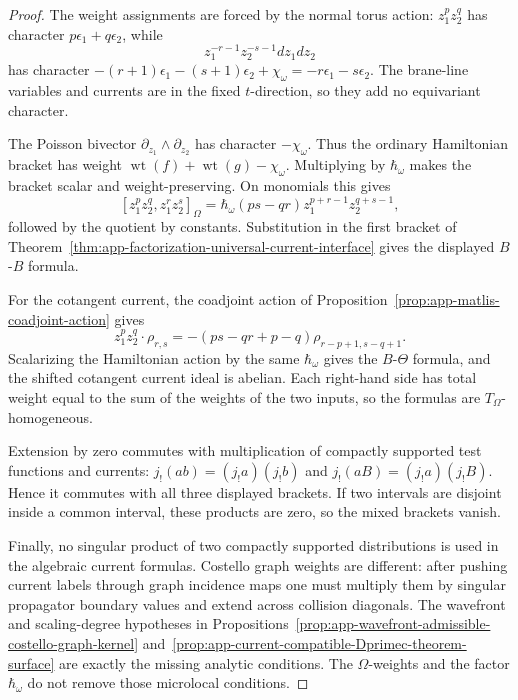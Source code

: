 \begin{proof}
  The weight assignments are forced by the normal torus action:
  \(z_1^pz_2^q\) has character \(p\epsilon_1+q\epsilon_2\), while
  \[
    z_1^{-r-1}z_2^{-s-1}dz_1dz_2
  \]
  has character
  \(-(r+1)\epsilon_1-(s+1)\epsilon_2+\chi_\omega
  =-r\epsilon_1-s\epsilon_2\).  The brane-line variables and currents are
  in the fixed \(t\)-direction, so they add no equivariant character.

  The Poisson bivector
  \(\partial_{z_1}\wedge\partial_{z_2}\) has character
  \(-\chi_\omega\).  Thus the ordinary Hamiltonian bracket has weight
  \(\operatorname{wt}(f)+\operatorname{wt}(g)-\chi_\omega\).  Multiplying by
  \(\hbar_\omega\) makes the bracket scalar and weight-preserving.  On
  monomials this gives
  \[
    [z_1^pz_2^q,z_1^rz_2^s]_\Omega
      =
      \hbar_\omega(ps-qr)z_1^{p+r-1}z_2^{q+s-1},
  \]
  followed by the quotient by constants.  Substitution in the first
  bracket of
  Theorem~\ref{thm:app-factorization-universal-current-interface} gives
  the displayed \(B\)-\(B\) formula.

  For the cotangent current, the coadjoint action of
  Proposition~\ref{prop:app-matlis-coadjoint-action} gives
  \[
    z_1^pz_2^q\cdot\rho_{r,s}
      =
      -(ps-qr+p-q)\rho_{r-p+1,s-q+1}.
  \]
  Scalarizing the Hamiltonian action by the same \(\hbar_\omega\) gives
  the \(B\)-\(\Theta\) formula, and the shifted cotangent current ideal is
  abelian.  Each right-hand side has total weight equal to the sum of the
  weights of the two inputs, so the formulas are
  \(T_\Omega\)-homogeneous.

  Extension by zero commutes with multiplication of compactly supported
  test functions and currents:
  \(j_!(ab)=(j_!a)(j_!b)\) and
  \(j_!(aB)=(j_!a)(j_!B)\).  Hence it commutes with all three displayed
  brackets.  If two intervals are disjoint inside a common interval, these
  products are zero, so the mixed brackets vanish.

  Finally, no singular product of two compactly supported distributions is
  used in the algebraic current formulas.  Costello graph weights are
  different: after pushing current labels through graph incidence maps one
  must multiply them by singular propagator boundary values and extend
  across collision diagonals.  The wavefront and scaling-degree hypotheses
  in
  Propositions~\ref{prop:app-wavefront-admissible-costello-graph-kernel}
  and~\ref{prop:app-current-compatible-Dprimec-theorem-surface} are exactly
  the missing analytic conditions.  The \(\Omega\)-weights and the factor
  \(\hbar_\omega\) do not remove those microlocal conditions.
\end{proof}

